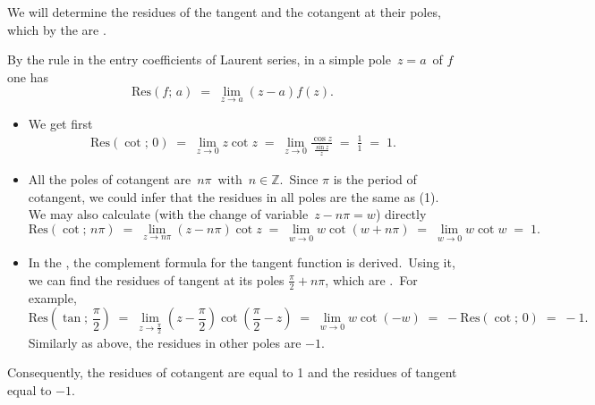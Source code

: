 \documentclass[12pt]{article}
\theoremstyle{definition}
\begin{document}
We will determine the residues of the tangent and the cotangent at their poles, which by the  are .

By the rule in the entry coefficients of Laurent series, in a simple pole \,$z = a$\, of $f$ one has
$$\mbox{Res}(f;\, a) \;=\; \lim_{z \to a}(z\!-\!a)f(z).$$

\begin{itemize}

\item We get first
\begin{align}
\mbox{Res}(\cot;\,0) \;=\; \lim_{z \to 0}z\cot{z} \;=\; \lim_{z \to 0}\frac{\cos{z}}{\frac{\sin{z}}{z}} 
\;=\; \frac{1}{1} \;=\;1.
\end{align}

\item All the poles of cotangent are \,$n\pi$\, with\, $n \in \mathbb{Z}$.\, Since $\pi$ is the period of cotangent, we could infer that the residues in all poles are the same as (1).\, We may also calculate (with the change of variable 
\,$z\!-\!n\pi = w$) directly
$$\mbox{Res}(\cot;\,n\pi) \;=\; \lim_{z \to n\pi}(z\!-\!n\pi)\cot{z} 
\;=\; \lim_{w \to 0}w\cot(w\!+\!n\pi) \;=\; \lim_{w \to 0}w\cot{w} \;=\; 1.$$

\item In the , the complement formula for the tangent function is derived.\, Using it, we can find the residues of tangent at its poles $\displaystyle\frac{\pi}{2}+n\pi$, which are .\, For example,
$$\mbox{Res}(\tan;\,\frac{\pi}{2}) \;=\; 
\lim_{z \to \frac{\pi}{2}}\left(z\!-\!\frac{\pi}{2}\right)\cot\left(\frac{\pi}{2}\!-\!z\right)
\;=\; \lim_{w \to 0}w\cot(-w) \;=\; -\mbox{Res}(\cot;\,0) \;=\; -1.$$
Similarly as above, the residues in other poles are $-1$.

\end{itemize}

Consequently, the residues of cotangent are equal to 1 and the residues of tangent equal to $-1$.
\end{document}
